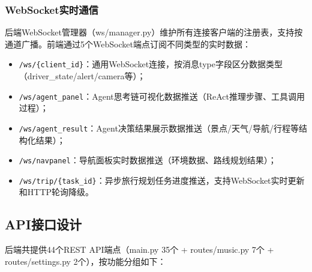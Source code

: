 \documentclass[a4paper]{article}
\begin{document}
\subsubsection{WebSocket实时通信}

后端WebSocket管理器（ws/manager.py）维护所有连接客户端的注册表，支持按通道广播。前端通过5个WebSocket端点订阅不同类型的实时数据：

\begin{itemize}
    \item \texttt{/ws/\{client\_id\}}：通用WebSocket连接，按消息type字段区分数据类型（driver\_state/alert/camera等）；
    \item \texttt{/ws/agent\_panel}：Agent思考链可视化数据推送（ReAct推理步骤、工具调用过程）；
    \item \texttt{/ws/agent\_result}：Agent决策结果展示数据推送（景点/天气/导航/行程等结构化结果）；
    \item \texttt{/ws/navpanel}：导航面板实时数据推送（环境数据、路线规划结果）；
    \item \texttt{/ws/trip/\{task\_id\}}：异步旅行规划任务进度推送，支持WebSocket实时更新和HTTP轮询降级。
\end{itemize}

\subsection{API接口设计}

后端共提供44个REST API端点（main.py 35个 + routes/music.py 7个 + routes/settings.py 2个），按功能分组如下：
\end{document}
